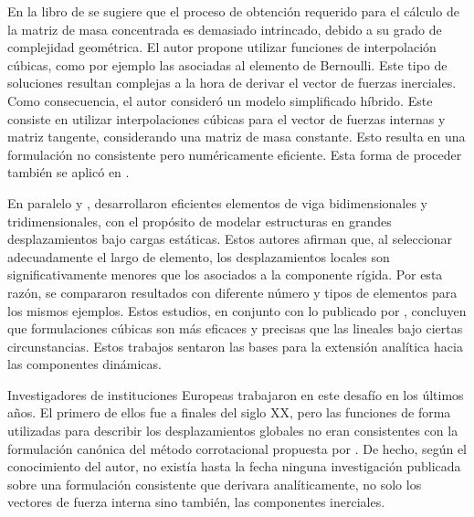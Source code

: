 En la libro de \cite{Crisfield} se sugiere que el proceso de obtención requerido para el cálculo de la matriz de masa concentrada es demasiado intrincado, debido a su grado de complejidad geométrica. El autor propone utilizar funciones de interpolación cúbicas, como por ejemplo las asociadas al elemento de Bernoulli. Este tipo de soluciones resultan complejas a la hora de derivar el vector de fuerzas inerciales. Como consecuencia, el autor consideró un modelo simplificado híbrido. Este consiste en utilizar interpolaciones cúbicas para el vector de fuerzas internas y matriz tangente, considerando una matriz de masa constante. Esto resulta en una formulación no consistente pero numéricamente eficiente.  Esta forma de proceder también se aplicó en \cite{pacoste1997beam}.

En paralelo \cite{Battini2002} y \cite{alsafadie2010corotational}, desarrollaron eficientes elementos de viga bidimensionales y tridimensionales, con el propósito de modelar estructuras en grandes desplazamientos bajo cargas estáticas.
Estos autores afirman que, al seleccionar adecuadamente el largo de elemento, los desplazamientos locales son significativamente menores que los asociados a la componente rígida. Por esta razón, se compararon resultados con diferente número y tipos de elementos para los mismos ejemplos. Estos estudios, en conjunto con lo publicado por \cite{alsafadie2010corotational}, concluyen que formulaciones cúbicas son más eficaces y precisas que las lineales bajo ciertas circunstancias. Estos trabajos sentaron las bases para la extensión analítica hacia las componentes dinámicas.

Investigadores de instituciones Europeas trabajaron en este desafío en los últimos años. El primero de ellos fue \cite{behdinan1998co} a finales del siglo XX, pero las funciones de forma utilizadas para describir los desplazamientos globales no eran consistentes con la formulación canónica del método corrotacional propuesta por \cite{simo1988dynamics}. De hecho, según el conocimiento del autor, no existía hasta la fecha ninguna investigación publicada sobre una formulación consistente que derivara analíticamente, no solo los vectores de fuerza interna sino también, las componentes inerciales.   

